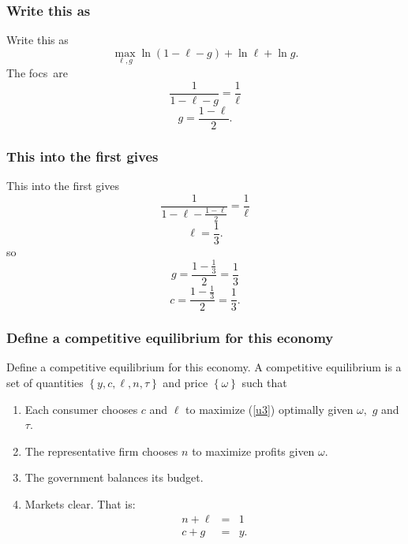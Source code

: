 \documentclass[aspectratio=169]{ltx-talk}
\begin{document}
\begin{frame}
\frametitle{Write this as}
Write this as%
\begin{equation*}
\underset{\ell ,g}{\max }\ln \left( 1-\ell -g\right) +\ln \ell +\ln g.
\end{equation*}%
The focs\ are 
\begin{equation*}
\frac{1}{1-\ell -g}=\frac{1}{\ell }
\end{equation*}%
\begin{equation*}
g=\frac{1-\ell }{2}.
\end{equation*}%
\end{frame}

\begin{frame}
\frametitle{This into the first gives}
This into the first gives%
\begin{equation*}
\frac{1}{1-\ell -\frac{1-\ell }{2}}=\frac{1}{\ell }
\end{equation*}%
\begin{equation*}
\ell =\frac{1}{3}.
\end{equation*}%
so 
\begin{equation*}
g=\frac{1-\frac{1}{3}}{2}=\frac{1}{3}
\end{equation*}%
\begin{equation*}
c=\frac{1-\frac{1}{3}}{2}=\frac{1}{3}.
\end{equation*}
\end{frame}

\begin{frame}
\frametitle{Define a competitive equilibrium for this economy}
Define a competitive equilibrium for this economy.\newline
A competitive equilibrium is a set of quantities $\left\{ y,c,\ell ,n,\tau
\right\} $ and price $\left\{ \omega \right\} $ such that

\begin{enumerate}
\item Each consumer chooses $c$ and $\ell $ to maximize (\ref{u3}) optimally
given $\omega ,$ $g$ and $\tau $.

\item The representative firm chooses $n$ to maximize profits given $\omega
. $

\item The government balances its budget.

\item Markets clear. That is:%
\begin{eqnarray*}
n+\ell &=&1 \\
c+g &=&y.
\end{eqnarray*}
\end{enumerate}
\end{frame}
\end{document}

